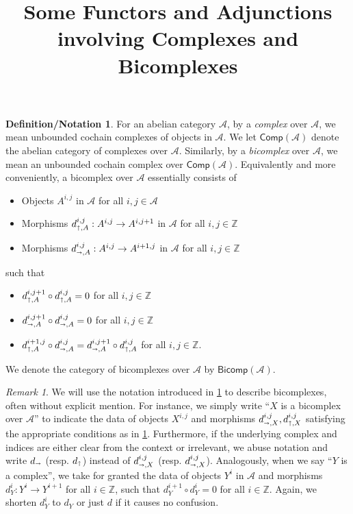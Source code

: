 \documentclass[oneside,11pt]{article}
\theoremstyle{definition}
\newtheorem{defnot}[thm]{Definition/Notation}
\theoremstyle{remark}
\newtheorem{rem}[thm]{Remark}
\begin{document}
\title{\textbf{Some Functors and Adjunctions involving Complexes and Bicomplexes}}
\author{}
\date{\vspace{-1.5cm}}
\maketitle
\begin{defnot}\label{compbicomp}
 For an abelian category $\mathscr{A} $, by a \emph{complex} over $\mathscr{A} $, we mean unbounded cochain complexes of objects in $\mathscr{A} $. We let $\textsf{Comp}(\mathscr{A} )$ denote the abelian category of complexes over $\mathscr{A} $.  Similarly, by a \emph{bicomplex} over $\mathscr{A} $, we mean an unbounded cochain complex over $\textsf{Comp}(\mathscr{A} )$. Equivalently and more conveniently, a bicomplex over $\mathscr{A} $ essentially consists of
 \begin{itemize}
  \item Objects $A^{i,j}$ in $\mathscr{A} $ for all $i,j\in \mathscr{A} $
 \item Morphisms $d_{\shortuparrow,A}^{i,j} : A^{i,j} \rightarrow A^{i,j+1} $ in $\mathscr{A} $ for all $i,j\in \mathbb{Z} $
 \item Morphisms $d_{\shortrightarrow,A}^{i,j}:A^{i,j} \rightarrow A^{i+1,j} $ in $\mathscr{A} $  for all $i,j\in \mathbb{Z} $ 
 \end{itemize}
 such that
 \begin{itemize}
	 \item $d_{\shortuparrow,A}^{i,j+1}\circ d_{\shortuparrow,A}^{i,j}=0$ for all $i,j\in \mathbb{Z} $
	 \item $d_{\shortrightarrow,A}^{i,j+1}\circ d_{\shortrightarrow,A}^{i,j}=0$ for all $i,j\in \mathbb{Z} $
	 \item $ d_{\shortuparrow,A}^{i+1,j} \circ d_{\shortrightarrow,A}^{i,j}=d_{\shortrightarrow,A}^{i,j+1} \circ d_{\shortuparrow,A}^{i,j}$ for all $i,j\in \mathbb{Z} $. 
 \end{itemize}
 We denote the category of bicomplexes over $\mathscr{A} $ by $\textsf{Bicomp}(\mathscr{A})$.  
\end{defnot}
\begin{rem}
	We will use the notation introduced in \cref{compbicomp} to describe bicomplexes, often without explicit mention. For instance, we simply write ``$X$ is a bicomplex over $\mathscr{A} $'' to indicate the data of objects $X^{i,j}$ and morphisms $d_{\shortrightarrow ,X}^{i,j}, d_{\shortuparrow ,X}^{i,j}$ satisfying the appropriate conditions as in \cref{compbicomp}. Furthermore, if the underlying complex and indices are either clear from the context or irrelevant, we abuse notation and write $d_{\shortrightarrow }$ (resp. $d_{\shortuparrow }$) instead of $d_{\shortrightarrow ,X}^{i,j}$ (resp. $d_{\shortrightarrow ,X}^{i,j}$). Analogously, when we say ``$Y$ is a complex'', we take for granted the data of objects $Y^{i}$ in $\mathscr{A} $ and morphisms $d_{Y}^{i}: Y^{i} \rightarrow  Y^{i+1}$ for all $i\in \mathbb{Z} $, such that $d^{i+1}_Y\circ d^{i}_Y=0$ for all $i\in \mathbb{Z} $. Again, we shorten $d^{i}_{Y}$ to $d_{Y}$ or just $d$ if it causes no confusion.         
\end{rem}
\end{document}
